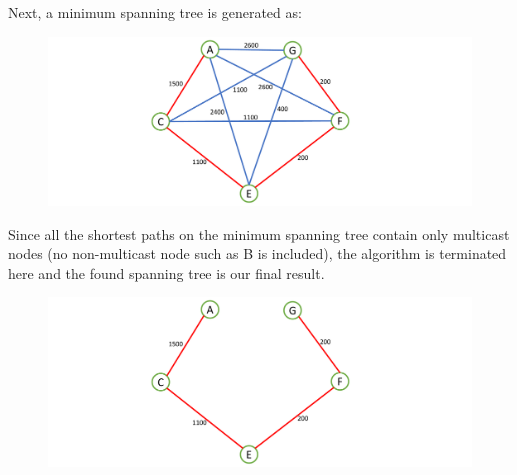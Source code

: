 \documentclass[10pt,letterpaper]{article}
\begin{document}
Next, a minimum spanning tree is generated as:
\begin{figure}[h!]
\centering
\includegraphics[width=160mm]{PSol6_Q7_2.pdf}
\end{figure}

Since all the shortest paths on the minimum spanning tree contain only multicast nodes (no non-multicast node such as B is included), the algorithm is terminated here and the found spanning tree is our final result.
\begin{figure}[h!]
\centering
\includegraphics[width=160mm]{PSol6_Q7_3.pdf}
\end{figure}
%
%
%
\end{document}
